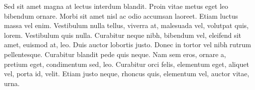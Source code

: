Sed sit amet magna at lectus interdum blandit. Proin vitae metus eget leo bibendum ornare. Morbi sit amet nisl ac odio accumsan laoreet. Etiam luctus massa vel enim. Vestibulum nulla tellus, viverra at, malesuada vel, volutpat quis, lorem. Vestibulum quis nulla. Curabitur neque nibh, bibendum vel, eleifend sit amet, euismod at, leo. Duis auctor lobortis justo. Donec in tortor vel nibh rutrum pellentesque. Curabitur blandit pede quis neque. Nam sem eros, ornare a, pretium eget, condimentum sed, leo. Curabitur orci felis, elementum eget, aliquet vel, porta id, velit. Etiam justo neque, rhoncus quis, elementum vel, auctor vitae, urna.
